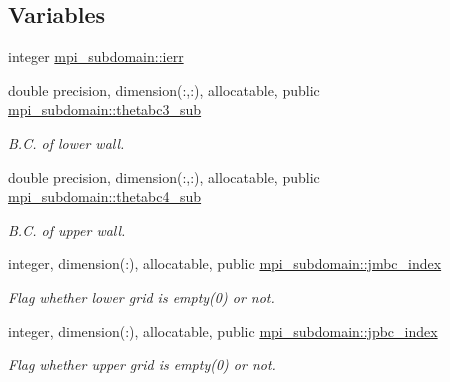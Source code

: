 \subsection*{Variables}
\begin{DoxyCompactItemize}
\item 
integer \mbox{\hyperlink{namespacempi__subdomain_acd16f258caed20a7d8d38cd28ae64688}{mpi\+\_\+subdomain\+::ierr}}
\item 
double precision, dimension(\+:,\+:), allocatable, public \mbox{\hyperlink{namespacempi__subdomain_ad61f27caf5f32301a077e21363c2d73b}{mpi\+\_\+subdomain\+::thetabc3\+\_\+sub}}
\begin{DoxyCompactList}\small\item\em B.\+C. of lower wall. \end{DoxyCompactList}\item 
double precision, dimension(\+:,\+:), allocatable, public \mbox{\hyperlink{namespacempi__subdomain_ad1705bede0c0d39ad16f9f94afe32be6}{mpi\+\_\+subdomain\+::thetabc4\+\_\+sub}}
\begin{DoxyCompactList}\small\item\em B.\+C. of upper wall. \end{DoxyCompactList}\item 
integer, dimension(\+:), allocatable, public \mbox{\hyperlink{namespacempi__subdomain_ac22380b1c941dd6c53cabe7287d185e9}{mpi\+\_\+subdomain\+::jmbc\+\_\+index}}
\begin{DoxyCompactList}\small\item\em Flag whether lower grid is empty(0) or not. \end{DoxyCompactList}\item 
integer, dimension(\+:), allocatable, public \mbox{\hyperlink{namespacempi__subdomain_a9adbfdd11c7e9fdb968bb8eef2b13c2b}{mpi\+\_\+subdomain\+::jpbc\+\_\+index}}
\begin{DoxyCompactList}\small\item\em Flag whether upper grid is empty(0) or not. \end{DoxyCompactList}\end{DoxyCompactItemize}
\textbf{ }\par
